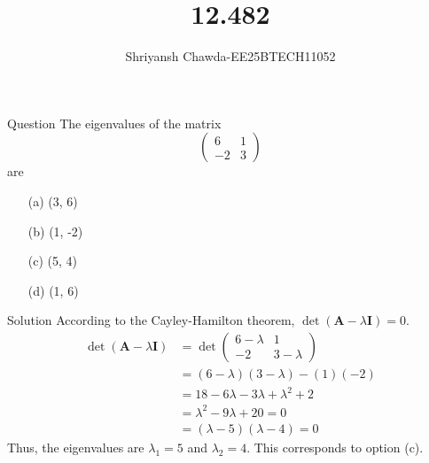 \documentclass{beamer}
\title{12.482}
\author{Shriyansh Chawda-EE25BTECH11052}
\newcommand{\myvec}[1]{\ensuremath{\begin{pmatrix}#1\end{pmatrix}}}
\begin{document}
	
	\frame{\titlepage}
	
	\begin{frame}{Question}
	The eigenvalues of the matrix 
\[
\myvec{6 & 1 \\ -2 & 3}
\]
are

\begin{multicols}{4}
	\begin{enumerate}
		\item[(a)] (3, 6)
		\item[(b)] (1, -2)
		\item[(c)] (5, 4)
		\item[(d)] (1, 6)
	\end{enumerate}
\end{multicols}

	\end{frame}
	
	\begin{frame}{Solution}
	According to the Cayley-Hamilton theorem,  $\det(\mathbf{A} - \lambda\mathbf{I}) = 0$.
\begin{align}
	\det(\mathbf{A} - \lambda\mathbf{I}) &= \det\myvec{6-\lambda & 1 \\ -2 & 3-\lambda} \\
	&= (6-\lambda)(3-\lambda) - (1)(-2) \\
	&= 18 - 6\lambda - 3\lambda + \lambda^2 + 2 \\
	&= \lambda^2 - 9\lambda + 20 = 0\\
	&=(\lambda - 5)(\lambda - 4) = 0
\end{align}
Thus, the eigenvalues are $\lambda_1 = 5$ and $\lambda_2 = 4$. This corresponds to option (c).

	\end{frame}
	
\end{document}
